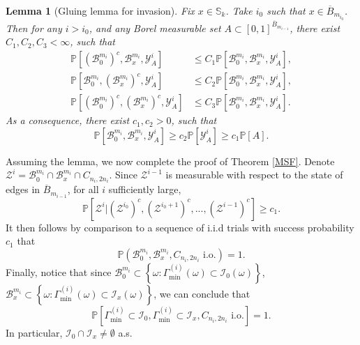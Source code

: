 \documentclass[12pt, twoside,a4paper,reqno]{amsart}
\theoremstyle{plain}
\newtheorem{lemma}[theorem]{Lemma}
\theoremstyle{remark}
\theoremstyle{definition}
\renewcommand{\bar}{\overline}
\begin{document}
\begin{lemma}[Gluing lemma for invasion]
\label{glue}Fix $x\in \mathbb{S}_{k}$. Take $i_{0}$ such that $x\in \bar{B}%
_{m_{i_{0}}}$. Then for any $i>i_{0}$, and any Borel measurable set $%
A\subset \left[ 0,1\right] ^{\bar{B}_{m_{i-1}}}$, there exist $%
C_{1},C_{2},C_{3}<\infty $, such that%
\begin{align}
\mathbb{P}\left[ \left( \mathcal{B}_{0}^{m_{i}}\right) ^{c},\mathcal{B}%
_{x}^{m_{i}},\mathcal{Y}_{A}^{i}\right]  &\leq C_{1}\mathbb{P}\left[
\mathcal{B}_{0}^{m_{i}},\mathcal{B}_{x}^{m_{i}},\mathcal{Y}_{A}^{i}\right] ,
\label{g1} \\
\mathbb{P}\left[ \mathcal{B}_{0}^{m_{i}},\left( \mathcal{B}%
_{x}^{m_{i}}\right) ^{c},\mathcal{Y}_{A}^{i}\right]  &\leq C_{2}\mathbb{P}%
\left[ \mathcal{B}_{0}^{m_{i}},\mathcal{B}_{x}^{m_{i}},\mathcal{Y}_{A}^{i}%
\right] ,  \label{g2} \\
\mathbb{P}\left[ \left( \mathcal{B}_{0}^{m_{i}}\right) ^{c},\left( \mathcal{B%
}_{x}^{m_{i}}\right) ^{c},\mathcal{Y}_{A}^{i}\right]  &\leq C_{3}\mathbb{P}%
\left[ \mathcal{B}_{0}^{m_{i}},\mathcal{B}_{x}^{m_{i}},\mathcal{Y}_{A}^{i}%
\right] .  \label{g3}
\end{align}%
As a consequence, there exist $c_{1},c_{2}>0$, such that
\begin{equation*}
\mathbb{P}\left[ \mathcal{B}_{0}^{m_{i}},\mathcal{B}_{x}^{m_{i}},\mathcal{Y}%
_{A}^{i}\right] \geq c_{2}\mathbb{P}\left[ \mathcal{Y}_{A}^{i}\right] \geq
c_{1}\mathbb{P}\left[ A\right] .
\end{equation*}
\end{lemma}

Assuming the lemma, we now complete the proof of Theorem \ref{MSF}. Denote $%
\mathcal{Z}^{i}=\mathcal{B}_{0}^{m_{i}}\cap \mathcal{B}_{x}^{m_{i}}\cap
C_{n_{i},2n_{i}}$. Since $\mathcal{Z}^{i-1}$ is measurable with respect to
the state of edges in $\bar{B}_{m_{i-1}}$, for all $i$ sufficiently large,
\begin{equation*}
\mathbb{P}\left[ \mathcal{Z}^{i}|\left( \mathcal{Z}^{i_{0}}\right)
^{c},\left( \mathcal{Z}^{i_{0}+1}\right) ^{c},...,\left( \mathcal{Z}%
^{i-1}\right) ^{c}\right] \geq c_{1}.
\end{equation*}%
It then follows by comparison to a sequence of i.i.d trials with success probability $c_{1}$ that
\begin{equation*}
\mathbb{P}\left( \mathcal{B}_{0}^{m_{i}},\mathcal{B}%
_{x}^{m_{i}},C_{n_{i},2n_{i}}\text{ i.o.}\right) =1.
\end{equation*}%
Finally, notice that since $\mathcal{B}_{0}^{m_{i}}\subset \left\{ \omega :\Gamma
_{\min }^{\left( i\right) }\left( \omega \right) \subset \mathcal{I}%
_{0}\left( \omega \right) \right\} $, $\mathcal{B}_{x}^{m_{i}}\subset
\left\{ \omega :\Gamma _{\min }^{\left( i\right) }\left( \omega \right)
\subset \mathcal{I}_{x}\left( \omega \right) \right\} $, we can conclude that%
\begin{equation*}
\mathbb{P}\left[ \Gamma _{\min }^{\left( i\right) }\subset \mathcal{I}%
_{0},\Gamma _{\min }^{\left( i\right) } \subset
\mathcal{I}_{x},C_{n_{i},2n_{i}}\text{ i.o.}\right] =1.
\end{equation*}%
In particular, $\mathcal{I}_{0}\cap \mathcal{I}_{x}\neq \emptyset $ a.s.
\end{document}
